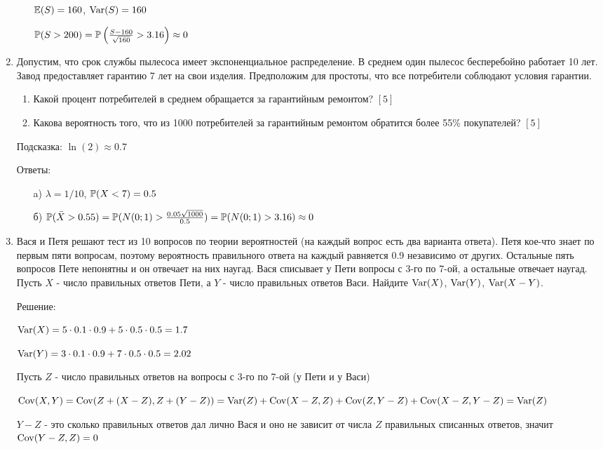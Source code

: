 \documentclass[12pt, a4paper]{article}\usepackage[]{graphicx}\usepackage[]{color}
\begin{document}
\begin{enumerate}
\begin{enumerate}
$\E(S)=160$, $\Var(S)=160$

$\P(S>200)=\P\left(\frac{S-160}{\sqrt{160}}>3.16\right)\approx 0$
\end{enumerate}

\item Допустим, что срок службы пылесоса имеет экспоненциальное распределение. В среднем один пылесос бесперебойно работает 10 лет. Завод предоставляет гарантию 7 лет на свои изделия. Предположим для простоты, что все потребители соблюдают условия гарантии.
\begin{enumerate}
\item Какой процент потребителей в среднем обращается за гарантийным ремонтом? $[5]$
\item Какова вероятность того, что из 1000 потребителей за гарантийным ремонтом обратится более 55\% покупателей? $[5]$
\end{enumerate}
Подсказка: $\ln(2)\approx 0.7$

Ответы:
\begin{enumerate}
\item[a)] $\lambda=1/10$, $\P(X<7)=0.5$
\item[б)] $\P(\bar{X}>0.55)=\P(N(0;1)>\frac{0.05\sqrt{1000}}{0.5})=\P(N(0;1)>3.16)\approx 0$
\end{enumerate}

\item Вася и Петя решают тест из 10 вопросов по теории вероятностей (на каждый вопрос есть два варианта ответа). Петя кое-что знает по первым пяти вопросам, поэтому вероятность правильного ответа на каждый равняется 0.9 независимо от других. Остальные пять вопросов Пете непонятны и он отвечает на них наугад. Вася списывает у Пети вопросы с 3-го по 7-ой, а остальные отвечает наугад.
Пусть $X$ - число правильных ответов Пети, а $Y$ - число правильных ответов Васи.
Найдите $\Var(X)$, $\Var(Y)$, $\Var(X-Y)$.

Решение:

$\Var(X)=5\cdot 0.1\cdot 0.9+5\cdot 0.5\cdot 0.5=1.7$

$\Var(Y)=3\cdot 0.1\cdot 0.9+7\cdot 0.5\cdot 0.5=2.02$

Пусть $Z$ - число правильных ответов на вопросы с 3-го по 7-ой (у Пети и у Васи)

$\Cov(X,Y)=\Cov(Z+(X-Z),Z+(Y-Z))=\Var(Z)+\Cov(X-Z,Z)+\Cov(Z,Y-Z)+\Cov(X-Z,Y-Z)=\Var(Z)$

$Y-Z$ - это сколько правильных ответов дал лично Вася и оно не зависит от числа $Z$ правильных списанных ответов, значит $\Cov(Y-Z,Z)=0$


\end{enumerate}
\end{document}
